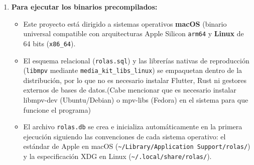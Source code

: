 \begin{itemize}
\begin{enumerate}
    \item \textbf{Para ejecutar los binarios precompilados:}
    \begin{itemize}
        \item Este proyecto está dirigido a sistemas operativos \textbf{macOS} (binario universal compatible con arquitecturas Apple Silicon \texttt{arm64}  y \textbf{Linux} de 64 bits (\texttt{x86\_64}).
        \item El esquema relacional (\texttt{rolas.sql}) y las librerías nativas de reproducción (\texttt{libmpv} mediante \texttt{media\_kit\_libs\_linux}) se empaquetan dentro de la distribución, por lo que no es necesario instalar Flutter, Rust ni gestores externos de bases de datos.(Cabe mencionar que es necesario instalar libmpv-dev (Ubuntu/Debian) o mpv-libs (Fedora) en el sistema para que funcione el programa)
        \item El archivo \texttt{rolas.db} se crea e inicializa automáticamente en la primera ejecución siguiendo las convenciones de cada sistema operativo: el estándar de Apple en macOS (\texttt{\textasciitilde/Library/Application Support/rolas/}) y la especificación XDG en Linux (\texttt{\textasciitilde/.local/share/rolas/}).
    \end{itemize}


\end{enumerate}
\end{itemize}
